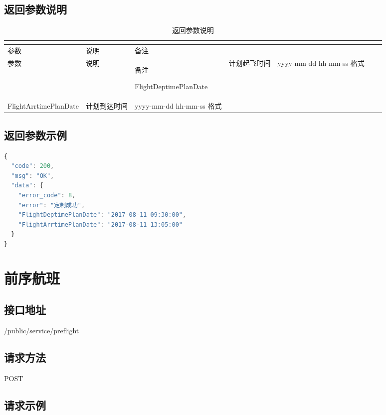 \section{返回参数说明}




\begin{longtable}{|m{100pt}|m{100pt}|m{180pt}|}
\tabularnewline\hline
参数&说明&备注
\endhead

\caption{返回参数说明}\\
\hline
参数&说明&备注
\endfirsthead

\endfoot

\endlastfoot
\hline
FlightDeptimePlanDate & 计划起飞时间&yyyy-mm-dd hh-mm-ss 格式\\
\hline
FlightArrtimePlanDate  & 计划到达时间&yyyy-mm-dd hh-mm-ss 格式\\
\hline
\end{longtable}




\section{返回参数示例}

\begin{lstlisting}[language=JavaScript]
{
  "code": 200,
  "msg": "OK",
  "data": {
    "error_code": 8,
    "error": "定制成功",
    "FlightDeptimePlanDate": "2017-08-11 09:30:00",
    "FlightArrtimePlanDate": "2017-08-11 13:05:00"
  }
}
\end{lstlisting}


\chapter{前序航班}


\section{接口地址}

/public/service/preflight


\section{请求方法}

POST

\section{请求示例}

